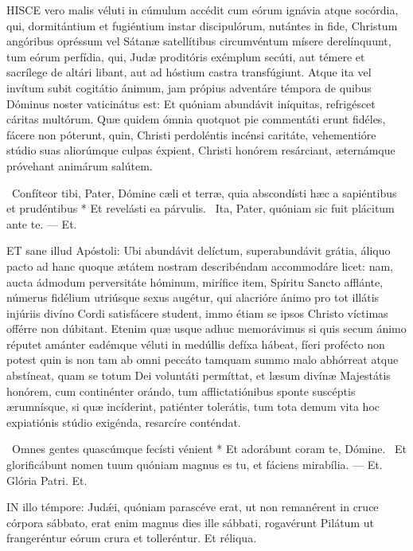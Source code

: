 \lettrine[lines=2]{H}{ISCE} vero malis véluti in cúmulum accédit cum eórum ignávia atque socórdia, qui, dormitántium et fugiéntium instar discipulórum, nutántes in fide, Christum angóribus opréssum vel Sátanæ satellítibus circumvéntum mísere derelínquunt, tum eórum perfídia, qui, Judæ proditóris exémplum secúti, aut témere et sacrílege de altári libant, aut ad hóstium castra transfúgiunt. Atque ita vel invítum subit cogitátio ánimum, jam própius adventáre témpora de quibus Dóminus noster vaticinátus est: Et quóniam abundávit iníquitas, refrigéscet cáritas multórum. Quæ quidem ómnia quotquot pie commentáti erunt fidéles, fácere non póterunt, quin, Christi perdoléntis incénsi caritáte, vehementióre stúdio suas aliorúmque culpas éxpient, Christi honórem resárciant, æternámque próvehant animárum salútem.

\R\ Confíteor tibi, Pater, Dómine cæli et terræ, quia abscondísti hæc a sapiéntibus et prudéntibus * Et revelásti ea párvulis. \V\ Ita, Pater, quóniam sic fuit plácitum ante te. --- Et.


\lettrine[lines=2]{E}{T} sane illud Apóstoli: Ubi abundávit delíctum, superabundávit grátia, áliquo pacto ad hanc quoque ætátem nostram describéndam accommodáre licet: nam, aucta ádmodum perversitáte hóminum, mirífice item, Spíritu Sancto afflánte, númerus fidélium utriúsque sexus augétur, qui alacrióre ánimo pro tot illátis injúriis divíno Cordi satisfácere student, immo étiam se ipsos Christo víctimas offérre non dúbitant. Etenim quæ usque adhuc memorávimus si quis secum ánimo réputet amánter eadémque véluti in medúllis defíxa hábeat, fíeri profécto non potest quin is non tam ab omni peccáto tamquam summo malo abhórreat atque abstíneat, quam se totum Dei voluntáti permíttat, et læsum divínæ Majestátis honórem, cum continénter orándo, tum afflictatiónibus sponte suscéptis ærumnísque, si quæ incíderint, patiénter tolerátis, tum tota demum vita hoc expiatiónis stúdio exigénda, resarcíre conténdat.

\R\ Omnes gentes quascúmque fecísti vénient * Et adorábunt coram te, Dómine. \V\ Et glorificábunt nomen tuum quóniam magnus es tu, et fáciens mirabília. --- Et. Glória Patri. Et.




\lettrine[lines=2]{I}{N} illo témpore: Judǽi, quóniam parascéve erat, ut non remanérent in cruce córpora sábbato, erat enim magnus dies ille sábbati, rogavérunt Pilátum ut frangeréntur eórum crura et tolleréntur. Et réliqua.

